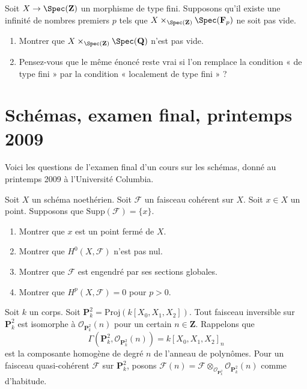 \begin{exercise}
\label{exercise-finite-type-over-Z}
Soit $X \to \Spec({\mathbf Z})$ un morphisme de type fini.
Supposons qu'il existe une infinité de nombres premiers $p$ tels que
$X \times_{\Spec({\mathbf Z})} \Spec({\mathbf F}_p)$ ne soit pas vide.
\begin{enumerate}
\item Montrer que $X \times_{\Spec({\mathbf Z})}\Spec(\mathbf{Q})$
n'est pas vide.
\item Pensez-vous que le même énoncé reste vrai si l'on remplace la condition
« de type fini » par la condition « localement de type fini » ?
\end{enumerate}
\end{exercise}




\section{Schémas, examen final, printemps 2009}
\label{section-final-exam-spring-2009}

\noindent
Voici les questions de l'examen final d'un cours sur les schémas,
donné au printemps 2009 à l'Université Columbia.

\begin{exercise}
\label{exercise-Noetherian-coherent}
Soit $X$ un schéma noethérien.
Soit $\mathcal{F}$ un faisceau cohérent sur $X$.
Soit $x \in X$ un point.
Supposons que $\text{Supp}(\mathcal{F}) = \{ x \}$.
\begin{enumerate}
\item Montrer que $x$ est un point fermé de $X$.
\item Montrer que $H^0(X, \mathcal{F})$ n'est pas nul.
\item Montrer que $\mathcal{F}$ est engendré par ses sections globales.
\item Montrer que $H^p(X, \mathcal{F}) = 0$ pour $p > 0$.
\end{enumerate}
\end{exercise}

\begin{remark}
\label{remark-invertible-projective-space}
Soit $k$ un corps.
Soit $\mathbf{P}^2_k = \text{Proj}(k[X_0, X_1, X_2])$.
Tout faisceau inversible sur $\mathbf{P}^2_k$ est isomorphe à
$\mathcal{O}_{\mathbf{P}^2_k}(n)$ pour un certain $n \in \mathbf{Z}$.
Rappelons que
$$
\Gamma(\mathbf{P}^2_k, \mathcal{O}_{\mathbf{P}^2_k}(n)) =
k[X_0, X_1, X_2]_n
$$
est la composante homogène de degré $n$ de l'anneau de polynômes.
Pour un faisceau quasi-cohérent $\mathcal{F}$ sur $\mathbf{P}^2_k$, posons
$\mathcal{F}(n) =
\mathcal{F}
\otimes_{\mathcal{O}_{\mathbf{P}^2_k}}
\mathcal{O}_{\mathbf{P}^2_k}(n)$
comme d'habitude.
\end{remark}

